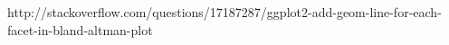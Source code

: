  
 http://stackoverflow.com/questions/17187287/ggplot2-add-geom-line-for-each-facet-in-bland-altman-plot
